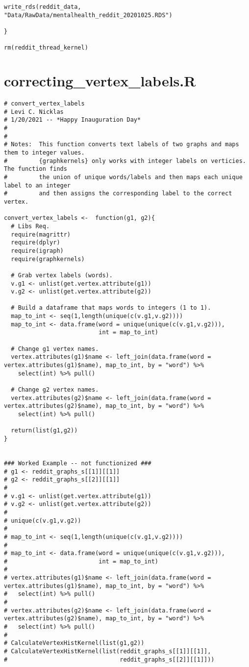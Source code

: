 \begin{appendices}
\begin{lstlisting}
write_rds(reddit_data, "Data/RawData/mentalhealth_reddit_20201025.RDS")

}

rm(reddit_thread_kernel)
\end{lstlisting}

\section{correcting\_vertex\_labels.R}
\begin{lstlisting}
# convert_vertex_labels
# Levi C. Nicklas
# 1/20/2021 -- *Happy Inauguration Day*
#
#
# Notes:  This function converts text labels of two graphs and maps them to integer values.
#         {graphkernels} only works with integer labels on verticies. The function finds 
#         the union of unique words/labels and then maps each unique label to an integer
#         and then assigns the corresponding label to the correct vertex.

convert_vertex_labels <-  function(g1, g2){
  # Libs Req.
  require(magrittr)
  require(dplyr)
  require(igraph)
  require(graphkernels)
  
  # Grab vertex labels (words).
  v.g1 <- unlist(get.vertex.attribute(g1))
  v.g2 <- unlist(get.vertex.attribute(g2))
  
  # Build a dataframe that maps words to integers (1 to 1).
  map_to_int <- seq(1,length(unique(c(v.g1,v.g2))))
  map_to_int <- data.frame(word = unique(unique(c(v.g1,v.g2))),
                           int = map_to_int)
  
  # Change g1 vertex names.
  vertex.attributes(g1)$name <- left_join(data.frame(word = vertex.attributes(g1)$name), map_to_int, by = "word") %>% 
    select(int) %>% pull()
  
  # Change g2 vertex names.
  vertex.attributes(g2)$name <- left_join(data.frame(word = vertex.attributes(g2)$name), map_to_int, by = "word") %>% 
    select(int) %>% pull()
  
  return(list(g1,g2))
}


### Worked Example -- not functionized ###
# g1 <- reddit_graphs_s[[1]][[1]]
# g2 <- reddit_graphs_s[[2]][[1]]
# 
# v.g1 <- unlist(get.vertex.attribute(g1))
# v.g2 <- unlist(get.vertex.attribute(g2))
# 
# unique(c(v.g1,v.g2))
# 
# map_to_int <- seq(1,length(unique(c(v.g1,v.g2))))
# 
# map_to_int <- data.frame(word = unique(unique(c(v.g1,v.g2))),
#                          int = map_to_int)
# 
# vertex.attributes(g1)$name <- left_join(data.frame(word = vertex.attributes(g1)$name), map_to_int, by = "word") %>% 
#   select(int) %>% pull()
# 
# vertex.attributes(g2)$name <- left_join(data.frame(word = vertex.attributes(g2)$name), map_to_int, by = "word") %>% 
#   select(int) %>% pull()
# 
# CalculateVertexHistKernel(list(g1,g2))
# CalculateVertexHistKernel(list(reddit_graphs_s[[1]][[1]],
#                                reddit_graphs_s[[2]][[1]]))
\end{lstlisting}


\end{appendices}
